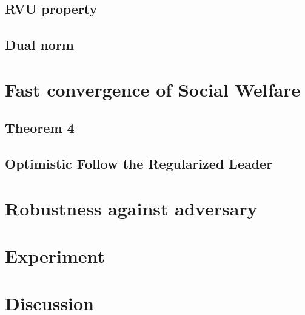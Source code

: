 \documentclass{beamer}
\begin{document}
\subsection{RVU property}
\subsection{Dual norm}

\section{Fast convergence of Social Welfare}
  \subsection{Theorem 4} %
  \subsection{Optimistic Follow the Regularized Leader} %

\section{Robustness against adversary}

\section{Experiment}

\section{Discussion}
\end{document}
